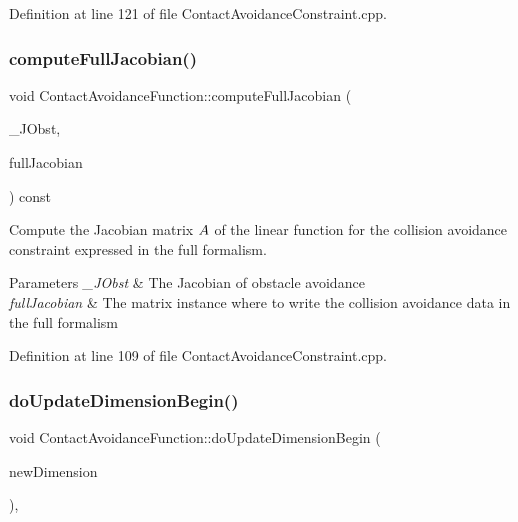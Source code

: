 Definition at line 121 of file Contact\+Avoidance\+Constraint.\+cpp.

\hypertarget{classocra_1_1ContactAvoidanceFunction_a59994d2c3f364575ecff7fb23b7e10ab}{}\label{classocra_1_1ContactAvoidanceFunction_a59994d2c3f364575ecff7fb23b7e10ab} 
\subsubsection{\texorpdfstring{compute\+Full\+Jacobian()}{computeFullJacobian()}}
{\footnotesize\ttfamily void Contact\+Avoidance\+Function\+::compute\+Full\+Jacobian (\begin{DoxyParamCaption}\item[{const Eigen\+::\+Matrix\+Xd \&}]{\+\_\+\+J\+Obst,  }\item[{Eigen\+::\+Matrix\+Xd \&}]{full\+Jacobian }\end{DoxyParamCaption}) const\hspace{0.3cm}{\ttfamily [protected]}}

Compute the Jacobian matrix $ A $ of the linear function for the collision avoidance constraint expressed in the full formalism.


\begin{DoxyParams}{Parameters}
{\em \+\_\+\+J\+Obst} & The Jacobian of obstacle avoidance \\
\hline
{\em full\+Jacobian} & The matrix instance where to write the collision avoidance data in the full formalism \\
\hline
\end{DoxyParams}


Definition at line 109 of file Contact\+Avoidance\+Constraint.\+cpp.

\hypertarget{classocra_1_1ContactAvoidanceFunction_a4f33ca5589b08a96207be800b9f4bd57}{}\label{classocra_1_1ContactAvoidanceFunction_a4f33ca5589b08a96207be800b9f4bd57} 
\subsubsection{\texorpdfstring{do\+Update\+Dimension\+Begin()}{doUpdateDimensionBegin()}}
{\footnotesize\ttfamily void Contact\+Avoidance\+Function\+::do\+Update\+Dimension\+Begin (\begin{DoxyParamCaption}\item[{int}]{new\+Dimension }\end{DoxyParamCaption})\hspace{0.3cm}{\ttfamily [protected]}, {\ttfamily [virtual]}}

